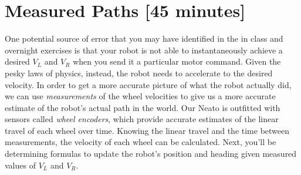 \documentclass{tufte-handout}
\begin{document}
\section{Measured Paths [45 minutes]}
One potential source of error that you may have identified in the in class and overnight exercises is that your robot is not able to instantaneously achieve a desired $V_L$ and $V_R$ when you send it a particular motor command. Given the pesky laws of physics, instead, the robot needs to accelerate to the desired velocity.  In order to get a more accurate picture of what the robot actually did, we can use \emph{measurements} of the wheel velocities to give us a more accurate estimate of the robot's actual path in the world.  Our Neato is outfitted with sensors called \emph{wheel encoders}, which provide accurate estimates of the linear travel of each wheel over time. Knowing the linear travel and the time between measurements, the velocity of each wheel can be calculated.  Next, you'll be determining formulas to update the robot's position and heading given measured values of $V_L$ and $V_R$.
\end{document}
